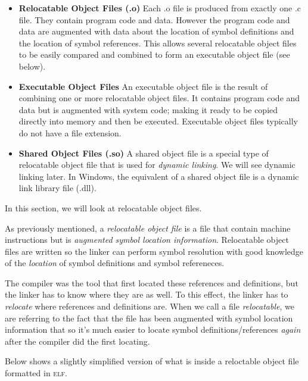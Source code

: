\begin{itemize}   
\renewcommand{\labelitemi}{$\Box$}
\item \textbf{Relocatable Object Files (.o)} 
Each .o file is produced from exactly one .c file. They contain program code and data. 
However the program code and data are augmented with data about the location of symbol 
definitions and the location of symbol references. 
This allows several relocatable object files to be easily compared and combined to form an 
executable object file (see below).
\item \textbf{Executable Object Files} 
An executable object file is the result of combining one or more relocatable object files. 
It contains program code and data but is augmented with 
system code; making it ready to be copied directly into memory and then be executed. 
Executable object files typically do not have a file extension. 
\item \textbf{Shared Object Files (.so)} 
A shared object file is a special type of relocatable object 
file that is used for \textit{dynamic linking}. We will see dynamic linking later. 
In Windows, the equivalent of a shared object file is a dynamic link library file (.dll).  
\end{itemize}


In this section, we will look at relocatable object files. 

As previously mentioned, 
a \textit{relocatable object file} is a file that contain machine instructions but is
\textit{augmented symbol location information}. Relocatable object files are written
so the linker can perform symbol resolution with good knowledge of the \textit{location} 
of symbol definitions and symbol refereneces.



The compiler was the tool that first located these references and definitions, 
but the linker has to know where they are as well. To this effect, the linker 
has to \textit{relocate} where references and definitions are. When we 
call a file \textit{relocatable}, we are referring to the fact that the file 
has been augmented with symbol location information that so it's much easier 
to locate symbol definitions/references \textit{again} 
after the compiler did the first locating.


Below shows a slightly simplified version of what is inside 
a reloctable object file formatted in \textsc{elf}. 


